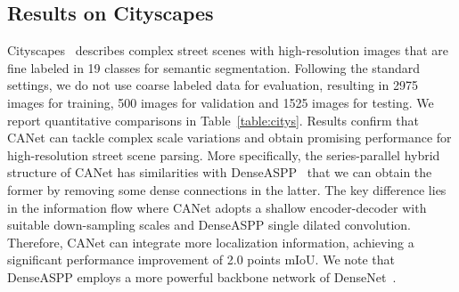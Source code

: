 \documentclass[journal]{IEEEtran}
\begin{document}
\subsection{Results on Cityscapes}
Cityscapes~\cite{Cordts_2016_CVPR} describes complex street scenes with high-resolution images that are fine labeled in 19 classes for semantic segmentation. Following the standard settings, we do not use coarse labeled data for evaluation, resulting in 2975 images for training, 500 images for validation and 1525 images for testing. We report quantitative comparisons in Table~\ref{table:citys}. Results confirm that CANet can tackle complex scale variations and obtain promising performance for high-resolution street scene parsing. More specifically, the series-parallel hybrid structure of CANet has similarities with DenseASPP~\cite{yang2018denseaspp} that we can obtain the former by removing some dense connections in the latter. The key difference lies in the information flow where CANet adopts a shallow encoder-decoder with suitable down-sampling scales and DenseASPP single dilated  convolution. Therefore, CANet can integrate more localization information, achieving a significant performance improvement of 2.0 points mIoU. We note that DenseASPP employs a more powerful backbone network of DenseNet~\cite{huang2017densely}.
\end{document}
